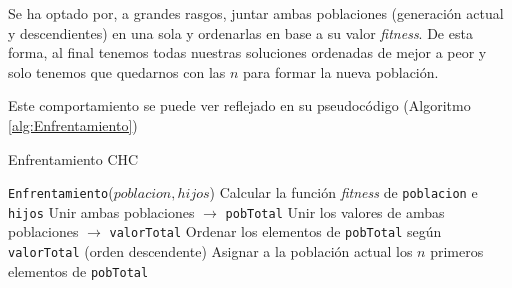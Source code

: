 Se ha optado por, a grandes rasgos, juntar ambas poblaciones (generación actual y descendientes) en una sola y ordenarlas en base a su valor \textit{fitness}. 
De esta forma, al final	tenemos todas nuestras soluciones ordenadas de mejor a peor y solo tenemos que quedarnos con las $n$ para formar la nueva población. 

Este comportamiento se puede ver reflejado en su pseudocódigo (Algoritmo \ref{alg:Enfrentamiento})

\begin{algorithm}[H]
\caption{Enfrentamiento CHC}\label{alg:Enfrentamiento}
\begin{algorithmic}[1]
\Procedure \texttt{Enfrentamiento}($poblacion, hijos$)
\State Calcular la función \textit{fitness} de \texttt{poblacion} e \texttt{hijos}
\State Unir ambas poblaciones $\xrightarrow{}{}$ \texttt{pobTotal}
\State Unir los valores de ambas poblaciones $\xrightarrow{}{}$ \texttt{valorTotal} 
\State Ordenar los elementos de \texttt{pobTotal} según \texttt{valorTotal} (orden descendente)
\State Asignar a la población actual los $n$ primeros elementos de \texttt{pobTotal}
\EndProcedure
\end{algorithmic}
\end{algorithm}
